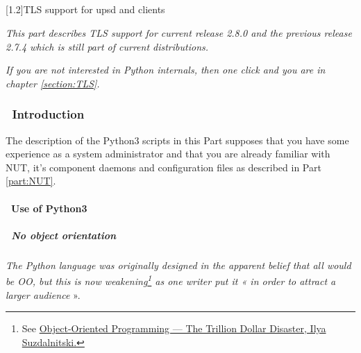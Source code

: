 \documentclass[12pt]{article}
\newlength{\headersep}\setlength{\headersep}{3mm}
\newcommand{\Hsep}{\hspace{\headersep}}
\newcommand{\newcolumn}{\vfill\eject}
\newcommand{\upsd}{\mbox{\textcolor{UPSDCOLOUR}{upsd}}}
\begin{document}
\begin{center}
\part[\hspace{\fill}\textsf{TLS support for \upsd\ and clients}\hspace{\fill}]{}\label{part:shim}
\vspace{7mm}
\scalebox{1.0}[1.2]{\textsf{\Huge{TLS support for upsd and clients}}}
\vspace{7mm}
\end{center}

\textit{This part describes TLS support for current release 2.8.0 and
  the previous release 2.7.4 which is still part of current
  distributions.}

\textit{If you are not interested in Python internals, then one click
  and you are in chapter \ref{section:TLS}.}

\vspace{7mm}

\section{\Hsep\ Introduction}\label{section:pyIntro}

The description of the Python3 scripts in this Part supposes that you have
some experience as a system administrator and that you are already familiar
with NUT, it's component daemons and configuration files as described in Part
\ref{part:NUT}.

\subsection{\Hsep\ Use of Python3}\label{section:pyUse}

\subsubsection{\Hsep\ No object orientation}\label{section:OO}

\textit{The Python language was originally designed in the apparent
  belief that all would be OO, but this is now weakening\footnote{ See
  \href{https://medium.com/better-programming/object-oriented-programming-the-trillion-dollar-disaster-92a4b666c7c7}%
       {Object-Oriented Programming — The Trillion Dollar Disaster,
         Ilya Suzdalnitski.}}  as one writer put it « in order to
  attract a larger audience} ».
\end{document}
